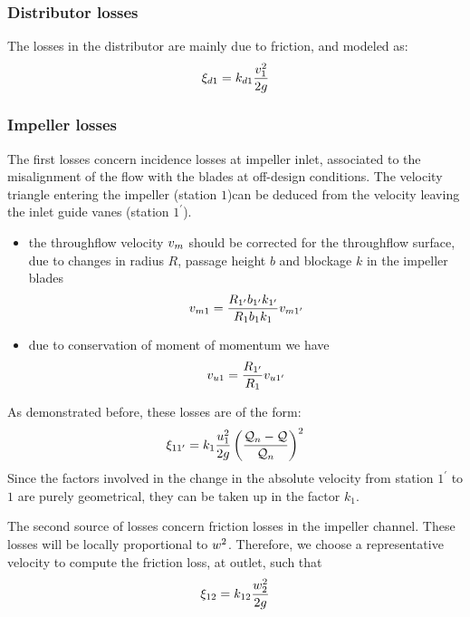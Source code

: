 \subsubsection{Distributor losses}

The losses in the distributor are mainly due to friction, and modeled
as:
\begin{align*}
  \xi_{d1} = k_{d1}\frac{v_1^2}{2g}
\end{align*}

\subsubsection{Impeller losses}

The first losses concern incidence losses at impeller inlet,
associated to the misalignment of the flow with the blades at
off-design conditions. The velocity triangle entering the impeller
(station $1$)can be deduced from the velocity leaving the inlet guide
vanes (station $1^\prime$).
\begin{itemize}
\item the throughflow velocity $v_m$ should be corrected for the
  throughflow surface, due to changes in radius $R$, passage height
  $b$ and blockage $k$ in the impeller blades 
  \begin{align*}
    v_{m1} = \frac{R_{1^\prime} b_{1^\prime} k_{1^\prime}}{R_1 b_1 k_1} v_{m1^\prime}
  \end{align*}
\item due to conservation of moment of momentum we have 
  \begin{align*}
    v_{u1} = \frac{R_{1^\prime}}{R_1} v_{u1^\prime}
  \end{align*}
\end{itemize}
As demonstrated before, these losses are of the form:
\begin{align*}
  \xi_{11^\prime} = k_1 \frac{u^2_1}{2g} 
  \left(\frac{\mathcal Q_n-\mathcal Q}{\mathcal Q_n}\right)^2
\end{align*}
Since the factors involved in the change in the absolute velocity from
station $1^\prime$ to $1$ are purely geometrical, they can be taken up
in the factor $k_1$.  

The second source of losses concern friction losses in the impeller
channel. These losses will be locally proportional to
$w^2$. Therefore, we choose a representative velocity to compute
the friction loss, \eg at outlet, such that
\begin{align*}
  \xi_{12} = k_{12} \frac{w_2^2}{2 g}
\end{align*}

